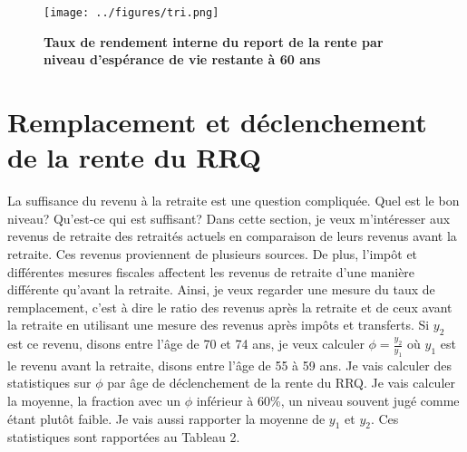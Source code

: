 \documentclass[french, 12pt]{article}
\begin{document}
	\begin{figure}[!htbp]
	\centering 
	\texttt{[image: ../figures/tri.png]}
	\caption{\textbf{Taux de rendement interne du report de la rente par niveau d'espérance de vie restante à 60 ans}}
	\label{fig:tri}
	\end{figure}	
	
	 
 	\newpage

	\section{Remplacement et déclenchement de la rente du RRQ}
	
	La suffisance du revenu à la retraite est une question compliquée. Quel est le bon niveau? Qu'est-ce qui est suffisant? Dans cette section, je veux m'intéresser aux revenus de retraite des retraités actuels en comparaison de leurs revenus avant la retraite. Ces revenus proviennent de plusieurs sources. De plus, l'impôt et différentes mesures fiscales affectent les revenus de retraite d'une manière différente qu'avant la retraite. Ainsi, je veux regarder une mesure du taux de remplacement, c'est à dire le ratio des revenus après la retraite et de ceux avant la retraite en utilisant une mesure des revenus après impôts et transferts. Si $y_2$ est ce revenu, disons entre l'âge de 70 et 74 ans, je veux calculer $\phi = \frac{y_2}{y_1}$ où $y_1$ est le revenu avant la retraite, disons entre l'âge de 55 à 59 ans.  Je vais calculer des statistiques sur $\phi$ par âge de déclenchement de la rente du RRQ. Je vais calculer la moyenne, la fraction avec un $\phi$ inférieur à 60\%, un niveau souvent jugé comme étant plutôt faible. Je vais aussi rapporter la moyenne de $y_1$ et $y_2$. Ces statistiques sont rapportées au Tableau 2. 
	
\end{document}
